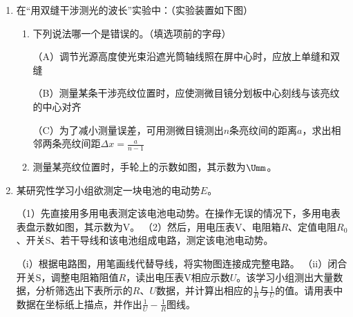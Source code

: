 \documentclass[\gkver]{gaokaozhenti}
\begin{document}
\begin{enumerate}
\item
在“用双缝干涉测光的波长”实验中：（实验装置如下图）
\begin{enumerate}
	\item
	下列说法哪一个是错误的\underline{\hspace{1.6cm}}。（填选项前的字母）

	（A）调节光源高度使光束沿遮光筒轴线照在屏中心时，应放上单缝和双缝

	（B）测量某条干涉亮纹位置时，应使测微目镜分划板中心刻线与该亮纹的中心对齐

	（C）为了减小测量误差，可用测微目镜测出$n$条亮纹间的距离$a$，求出相邻两条亮纹间距$\Delta x=\frac{a}{n-1}$
	\item
	测量某亮纹位置时，手轮上的示数如图，其示数为\underline{\hspace{1.6cm}}$\Umm$。
\end{enumerate}

\item
某研究性学习小组欲测定一块电池的电动势$E$。

（1）先直接用多用电表测定该电池电动势。在操作无误的情况下，多用电表表盘示数如图，其示数为\underline{\hspace{1.6cm}}V。
（2）然后，用电压表V、电阻箱$R$、定值电阻$R_{0}$、开关S、若干导线和该电池组成电路，测定该电池电动势。

（i）根据电路图，用笔画线代替导线，将实物图连接成完整电路。
（ii）闭合开关S，调整电阻箱阻值$R$，读出电压表V相应示数$U$。该学习小组测出大量数据，分析筛选出下表所示的$R$、$U$数据，并计算出相应的$\frac{1}{R}$与$\frac{1}{U}$的值。请用表中数据在坐标纸上描点，并作出$\frac{1}{U}-\frac{1}{R}$图线。


\end{enumerate}
\end{document}
